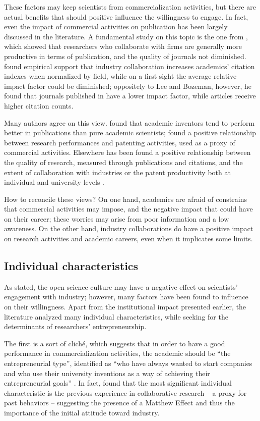 These factors may keep scientists from commercialization activities, but there are actual benefits that should positive influence the willingness to engage. In fact, even the impact of commercial activities on publication has been largely discussed in the literature. A fundamental study on this topic is the one from \citet{Lee2005}, which showed that researchers who collaborate with firms are generally more productive in terms of publication, and the quality of journals not diminished. \citet{Lebeau2008} found empirical support that industry collaboration increases academics' citation indexes when normalized by field, while on a first sight the average relative impact factor could be diminished; oppositely to Lee and Bozeman, however, he found that journals published in have a lower impact factor, while articles receive higher citation counts.

Many authors agree on this view. \citet{Meyer2006} found that academic inventors tend to perform better in publications than pure academic scientists; \citet{Wong2010} found a positive relationship between research performances and patenting activities, used as a proxy of commercial activities. Elsewhere has been found a positive relationship between the quality of research, measured through publications and citations, and the extent of collaboration with industries \citep{AzagraCaro2010} or the patent productivity both at individual and university levels \citep{Baldini2007}.

How to reconcile these views? On one hand, academics are afraid of constrains that commercial activities may impose, and the negative impact that could have on their career; these worries may arise from poor information and a low awareness. On the other hand, industry collaborations do have a positive impact on research activities and academic careers, even when it implicates some limits.

\subsection{Individual characteristics}

As stated, the open science culture may have a negative effect on scientists' engagement with industry; however, many factors have been found to influence on their willingness. Apart from the institutional impact presented earlier, the literature analyzed many individual characteristics, while seeking for the determinants of researchers' entrepreneurship.

The first is a sort of cliché, which suggests that in order to have a good performance in commercialization activities, the academic should be \enquote{the entrepreneurial type}, identified as \enquote{who have always wanted to start companies and who use their university inventions as a way of achieving their entrepreneurial goals} \citep{Fini2009}. In fact, \citet{DEste2007} found that the most significant individual characteristic is the previous experience in collaborative research – a proxy for past behaviors – suggesting the presence of a Matthew Effect and thus the importance of the initial attitude toward industry.


